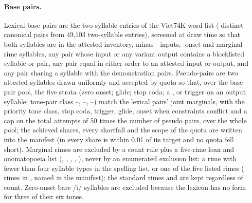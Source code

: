 \paragraph{Base pairs.}
Lexical base pairs are the two-syllable entries of the Viet74K word list (\releaseNLexicalPairsAvailable{} distinct canonical pairs from 49,103 two-syllable entries), screened at draw time so that both syllables are in the attested inventory, minus - inputs, -onset and marginal-rime syllables, any pair whose input or any variant output contains a blocklisted syllable or pair, any pair equal in either order to an attested input or output, and any pair sharing a syllable with the demonstration pairs. Pseudo-pairs are two attested syllables drawn uniformly and accepted by quota so that, over the base-pair pool, the five strata (zero onset; glide; stop coda; a ,  or  trigger on an output syllable; tone-pair class --, --, --) match the lexical pairs' joint marginals, with the priority tone class, stop coda, trigger, glide, onset when constraints conflict and a cap on the total attempts of 50 times the number of pseudo pairs, over the whole pool; the achieved shares, every shortfall and the scope of the quota are written into the manifest (in \releaseVersion{} every share is within 0.01 of its target and no quota fell short). Marginal rimes are excluded by a count rule plus a five-rime loan and onomatopoeia list (, , , , ), never by an enumerated exclusion list: a rime with fewer than four syllable types in the spelling list, or one of the five listed rimes (\releaseNMarginalRimes{} rimes in \releaseVersion{}, named in the manifest); the standard rimes  and  are kept regardless of count. Zero-onset bare /i/ syllables are excluded because the lexicon has no form for three of their six tones.

